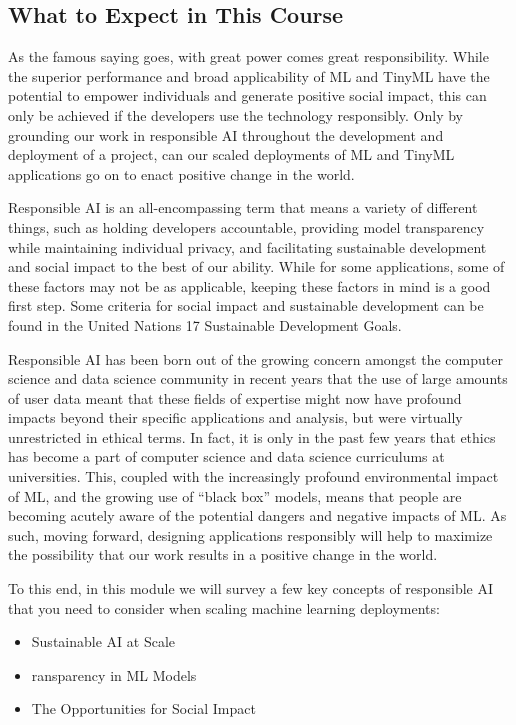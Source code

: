 {{{{{{{{\subsection{What to Expect in This Course}

    As the famous saying goes, with great power comes great responsibility. While the superior performance and broad applicability of ML and TinyML have the potential to empower individuals and generate positive social impact, this can only be achieved if the developers use the technology responsibly. Only by grounding our work in responsible AI throughout the development and deployment of a project, can our scaled deployments of ML and TinyML applications go on to enact positive change in the world. 
    
    Responsible AI is an all-encompassing term that means a variety of different things, such as holding developers accountable, providing model transparency while maintaining individual privacy, and facilitating sustainable development and social impact to the best of our ability. While for some applications, some of these factors may not be as applicable, keeping these factors in mind is a good first step. Some criteria for social impact and sustainable development can be found in the United Nations 17 Sustainable Development Goals.
    
    Responsible AI has been born out of the growing concern amongst the computer science and data science community in recent years that the use of large amounts of user data meant that these fields of expertise might now have profound impacts beyond their specific applications and analysis, but were virtually unrestricted in ethical terms. In fact, it is only in the past few years that ethics has become a part of computer science and data science curriculums at universities. This, coupled with the increasingly profound environmental impact of ML, and the growing use of “black box” models, means that people are becoming acutely aware of the potential dangers and negative impacts of ML. As such, moving forward, designing applications responsibly will help to maximize the possibility that our work results in a positive change in the world.
    
    To this end, in this module we will survey a few key concepts of responsible AI that you need to consider when scaling machine learning deployments:
    
    \begin{itemize}
      \item Sustainable AI at Scale
      \item ransparency in ML Models
      \item The Opportunities for Social Impact
    \end{itemize}

}}}}}}}}

